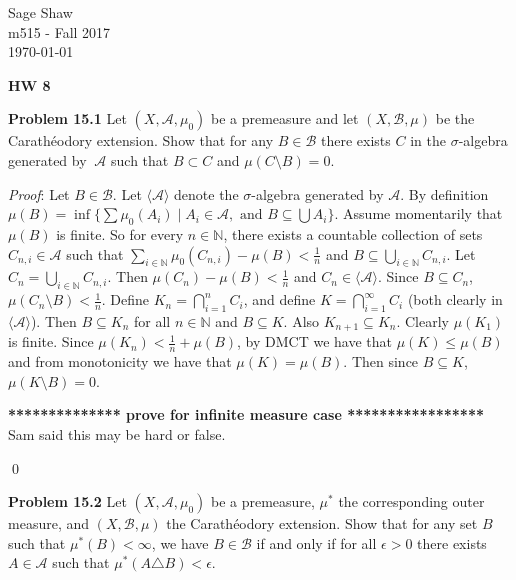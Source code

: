 \documentclass[12pt]{article}
\newcommand{\problem}[1]{\hspace{-4 ex} \large \textbf{Problem #1} }
\renewenvironment{proof}{\hspace{-4 ex} \emph{Proof}:}{\qed}
\newcommand{\NN}{\mathbb{N}}
\newcommand{\BB}{\mathcal{B}}
\newcommand{\SA}{\mathcal{A}}
\begin{document}
	\thispagestyle{empty}
	
	\begin{flushright}
		Sage Shaw \\
		m515 - Fall 2017 \\
		\today
	\end{flushright}
	
{\large \textbf{HW 8}}\bigbreak

\problem{15.1} 
Let $(X, \SA,\mu_0)$ be a premeasure and let $(X,\mathcal B,\mu)$ be the Carath\'eodory extension. Show that for any $B \in \BB$ there exists $C$ in the $\sigma$-algebra generated by $\ \SA$ such that $B\subset C$ and $\mu(C\setminus B)=0$.
\bigbreak

\begin{proof}
	Let $B \in \BB$. Let $\langle \SA \rangle$ denote the $\sigma$-algebra generated by $\SA$. By definition $\mu(B) = \inf \Big\{ \sum \mu_0(A_i) \mid A_i \in \mathcal{A}, \text{ and } B \subseteq \bigcup A_i \Big\}$. Assume momentarily that $\mu(B)$ is finite. So for every $n \in \NN$, there exists a countable collection of sets $C_{n,i} \in \mathcal{A}$ such that $\sum\limits_{i \in \NN} \mu_0(C_{n,i}) - \mu(B) < \tfrac{1}{n}$ and $B \subseteq \bigcup\limits_{i \in \NN} C_{n,i}$. Let $C_n = \bigcup\limits_{i \in \NN} C_{n,i}$. Then $\mu(C_n) - \mu(B) < \tfrac{1}{n}$ and $C_n \in \langle \SA \rangle$. Since $B \subseteq C_n$, $\mu(C_n \setminus B) < \tfrac{1}{n}$. Define $K_n = \bigcap_{i=1}^n C_i$, and define $K = \bigcap_{i=1}^\infty C_i$ (both clearly in $\langle \SA \rangle$). Then $B \subseteq K_n$ for all $n \in \NN$ and $B \subseteq K$. Also $K_{n+1} \subseteq K_n$. Clearly $\mu(K_1)$ is finite. Since $\mu(K_n) < \tfrac{1}{n} + \mu(B)$, by DMCT we have that $\mu(K) \leq \mu(B)$ and from monotonicity we have that $\mu(K) = \mu(B)$. Then since $B \subseteq K$, $\mu(K \setminus B) = 0$. \bigbreak
	
	\textbf{************** prove for infinite measure case *****************}
	Sam said this may be hard or false.
	
\end{proof}



\bigbreak
\problem{15.2} Let $(X,\mathcal A,\mu_0)$ be a premeasure, $\mu^*$ the corresponding outer measure, and $(X,\mathcal B,\mu)$ the Carath\'eodory extension. Show that for any set $B$ such that $\mu^*(B)<\infty$, we have $B\in\mathcal B$ if and only if for all $\epsilon>0$ there exists $A\in\mathcal A$ such that $\mu^*(A\triangle B)<\epsilon$.
\bigbreak
\end{document}
